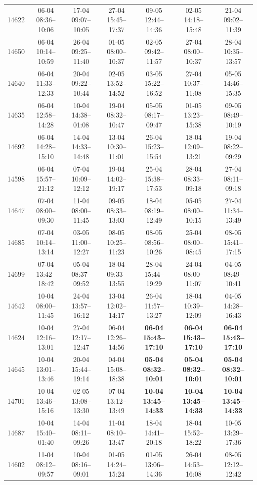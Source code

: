 \begin{table}[htbp]
\begin{tabular}{|r|c|c|c|c|c|c|}
14622 & 06-04 08:36--10:06 & 17-04 09:07--10:05 & 27-04 15:45--17:37 & 09-05 12:44--14:36 & 02-05 14:18--15:48 & 21-04 09:02--11:39 \\ 
14650 & 06-04 10:14--10:59 & 26-04 09:25--11:40 & 01-05 08:00--10:37 & 02-05 09:42--11:57 & 27-04 08:00--10:37 & 28-04 10:35--13:57 \\ 
14640 & 06-04 11:33--12:33 & 20-04 09:22--10:44 & 02-05 13:52--14:52 & 03-05 15:22--16:52 & 27-04 10:37--11:08 & 05-05 14:46--15:35 \\ 
14635 & 06-04 12:58--14:28 & 10-04 14:38--01:08 & 19-04 08:32--10:47 & 05-05 08:17--09:47 & 01-05 13:23--15:38 & 09-05 08:49--10:19 \\ 
14692 & 06-04 14:28--15:10 & 14-04 14:33--14:48 & 13-04 10:30--11:01 & 26-04 15:23--15:54 & 18-04 12:09--13:21 & 19-04 08:22--09:29 \\ 
14598 & 06-04 15:57--21:12 & 07-04 10:09--12:12 & 19-04 14:02--19:17 & 25-04 15:38--17:53 & 28-04 08:33--09:18 & 27-04 08:11--09:18 \\ 
14647 & 07-04 08:00--09:30 & 11-04 08:00--11:45 & 09-05 08:33--13:03 & 18-04 08:19--12:49 & 05-05 08:00--10:15 & 27-04 11:34--13:49 \\ 
14685 & 07-04 10:14--13:14 & 03-05 11:00--12:27 & 08-05 10:25--11:23 & 08-05 08:56--10:26 & 25-04 08:00--08:45 & 08-05 15:41--17:15 \\ 
14699 & 07-04 13:42--18:42 & 05-04 08:37--09:52 & 18-04 09:33--13:55 & 28-04 15:44--19:29 & 24-04 08:00--11:07 & 04-05 08:49--10:41 \\ 
14642 & 10-04 08:00--11:45 & 24-04 13:57--16:12 & 13-04 12:02--14:17 & 26-04 11:57--13:27 & 18-04 10:39--12:09 & 04-05 14:28--16:43 \\ 
14624 & 10-04 12:16--13:01 & 27-04 12:17--12:47 & 06-04 12:26--14:56 & \textbf{06-04 15:43--17:10} & \textbf{06-04 15:43--17:10} & \textbf{06-04 15:43--17:10} \\ 
14645 & 10-04 13:01--13:46 & 20-04 15:44--19:14 & 04-04 15:08--18:38 & \textbf{05-04 08:32--10:01} & \textbf{05-04 08:32--10:01} & \textbf{05-04 08:32--10:01} \\ 
14701 & 10-04 13:46--15:16 & 02-05 13:08--13:30 & 07-04 13:12--13:49 & \textbf{10-04 13:45--14:33} & \textbf{10-04 13:45--14:33} & \textbf{10-04 13:45--14:33} \\ 
14687 & 10-04 15:40--01:40 & 14-04 08:11--09:26 & 11-04 08:10--13:47 & 18-04 14:41--20:18 & 18-04 15:52--18:22 & 10-05 13:29--17:36 \\ 
14602 & 11-04 08:12--09:57 & 10-04 08:16--09:01 & 01-05 14:24--15:24 & 01-05 13:06--14:36 & 26-04 14:53--16:08 & 08-05 12:12--12:42 \\ 

\end{tabular}
\end{table}
